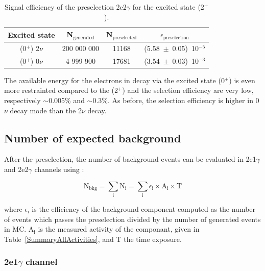 \documentclass[main.tex]{subfiles}
\begin{document}
\begin{table}[h!]
\begin{center}
\begin{tabular}{c|c|c|c}
\toprule
Excited state & N$_\text{{generated}}$ & N$_\text{{preselected}}$ & $\epsilon_\text{{preselection}}$ \\[0.1cm]
\midrule
(0$^+$) 2$\nu$ & 200 000 000 & 11168 & (5.58~$\pm$~0.05)~10$^{-\text{5}}$\\[0.1cm]
(0$^+$) 0$\nu$ &   4 999 900 & 17681 & (3.54~$\pm$~0.03)~10$^{-\text{3}}$\\[0.1cm]
\bottomrule
\end{tabular}
\caption{Signal efficiency of the preselection 2e2$\gamma$ for the excited state (2$^+$).}
\label{EffPreselection0PLUS}
\end{center}
\end{table}


\NI The available energy for the electrons in decay via the excited state (0$^+$) is even more restrainted compared to the (2$^+$) and the selection efficiency are very low, respectively $\sim$0.005\% and $\sim$0.3\%. As before, the selection efficiency is higher in 0$\nu$ decay mode than the 2$\nu$ decay.  


\subsection{Number of expected background}


\NI After the preselection, the number of background events can be evaluated in 2e1$\gamma$ and 2e2$\gamma$ channels using :


\begin{equation}
\text{N}_{\text{bkg}} = \sum_\text{i} \text{N}_\text{i} = \sum_\text{i} \epsilon_\text{i} \times \text{A}_\text{i} \times \text{T}
\end{equation}


\bigskip


\NI where $\epsilon_\text{i}$ is the efficiency of the background component computed as the number of events which passes the preselection divided by the number of generated events in MC. A$_\text{i}$ is the measured activity of the componant, given in Table~\ref{SummaryAllActivities}, and T the time exposure.


\subsubsection{2e1$\gamma$ channel}
\end{document}
